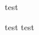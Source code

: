 \documentclass[12pt]{article}
\title{}
\author{Jack Duignan}
\date{}
\begin{document}
\maketitle

\newpage




test

test test

% 

% 
\end{document}
